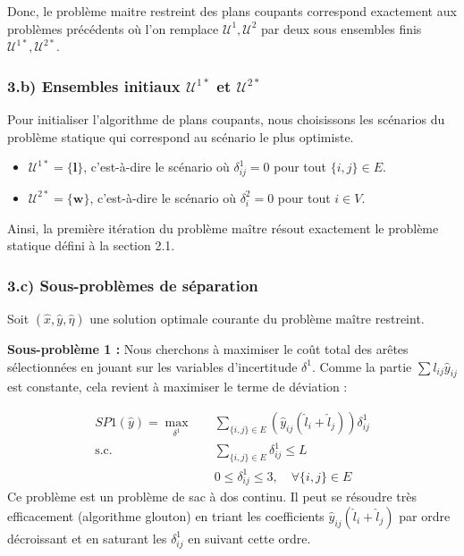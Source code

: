 \documentclass{article}
\begin{document}
Donc, le problème maitre restreint des plans coupants correspond exactement aux problèmes précédents où l'on remplace $\mathcal{U}^1, \mathcal{U}^2$ par deux sous ensembles finis $\mathcal{U}^{1*}, \mathcal{U}^{2*}$.
\subsubsection*{3.b) Ensembles initiaux $\mathcal{U}^{1*}$ et $\mathcal{U}^{2*}$}

Pour initialiser l'algorithme de plans coupants, nous choisissons les scénarios du problème statique qui correspond au scénario le plus optimiste.
\begin{itemize}
    \item $\mathcal{U}^{1*} = \{ \mathbf{l} \}$, c'est-à-dire le scénario où $\delta_{ij}^1 = 0$ pour tout $\{i,j\} \in E$.
    \item $\mathcal{U}^{2*} = \{ \mathbf{w} \}$, c'est-à-dire le scénario où $\delta_{i}^2 = 0$ pour tout $i \in V$.
\end{itemize}
Ainsi, la première itération du problème maître résout exactement le problème statique défini à la section 2.1.

\subsubsection*{3.c) Sous-problèmes de séparation}

Soit $(\hat{x}, \hat{y}, \hat{\eta})$ une solution optimale courante du problème maître restreint.

\textbf{Sous-problème 1 :}
Nous cherchons à maximiser le coût total des arêtes sélectionnées en jouant sur les variables d'incertitude $\delta^1$. Comme la partie  $\sum l_{ij} \hat{y}_{ij}$ est constante, cela revient à maximiser le terme de déviation :

\begin{align*}
    SP1(\hat{y}) = \max_{\delta^1} \quad & \sum_{\{i,j\} \in E} \left( \hat{y}_{ij} (\hat{l}_i + \hat{l}_j) \right) \delta_{ij}^1 \\
    \text{s.c.} \quad & \sum_{\{i,j\} \in E} \delta_{ij}^1 \le L \\
    & 0 \le \delta_{ij}^1 \le 3, \quad \forall \{i,j\} \in E
\end{align*}
Ce problème est un problème de sac à dos continu. Il peut se résoudre très efficacement (algorithme glouton) en triant les coefficients $\hat{y}_{ij} (\hat{l}_i + \hat{l}_j)$ par ordre décroissant et en saturant les $\delta_{ij}^1$ en suivant cette ordre.
\end{document}
